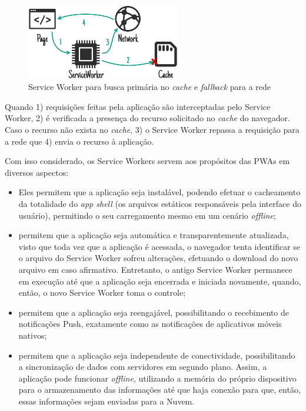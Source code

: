 \documentclass[
	article,			%
	11pt,				%
	oneside,			%
	a4paper,			%
	english,			%
	brazil,				%
	sumario=tradicional
	]{abntex2}
\begin{document}
\begin{figure}[!htb]
	\label{Service Worker}
	\centering
	\caption{Service Worker para busca primária no \textit{cache} e \textit{fallback} para a rede}
	\includegraphics[width=0.6\textwidth]{figures/ss-falling-back-to-network}
\end{figure}

Quando 1) requisições feitas pela aplicação são interceptadas pelo Service Worker, 2) é verificada a presença do recurso solicitado no \textit{cache} do navegador. Caso o recurso não exista no \textit{cache}, 3) o Service Worker repassa a requisição para a rede que 4) envia o recurso à aplicação.

Com isso considerado, os Service Workers servem aos propósitos das PWAs em diversos aspectos:

\begin{itemize}
	\item
	Eles permitem que a aplicação seja instalável, podendo efetuar o cacheamento da totalidade do \textit{app shell} (os arquivos estáticos responsáveis pela interface do usuário), permitindo o seu carregamento mesmo em um cenário \textit{offline};
	\item    
	permitem que a aplicação seja automática e transparentemente atualizada, visto que toda vez que a aplicação é acessada, o navegador tenta identificar se o arquivo do Service Worker sofreu alterações, efetuando o download do novo arquivo em caso afirmativo. Entretanto, o antigo Service Worker permanece em execução até que a aplicação seja encerrada e iniciada novamente, quando, então, o novo Service Worker toma o controle;
	\item
	permitem que a aplicação seja reengajável, possibilitando o recebimento de notificações Push, exatamente como as notificações de aplicativos móveis nativos;
	\item
	permitem que a aplicação seja independente de conectividade, possibilitando a sincronização de dados com servidores em segundo plano. Assim, a aplicação pode funcionar \textit{offline}, utilizando a memória do próprio dispositivo para o armazenamento das informações até que haja conexão para que, então, essas informações sejam enviadas para a Nuvem.
\end{itemize}
\end{document}
